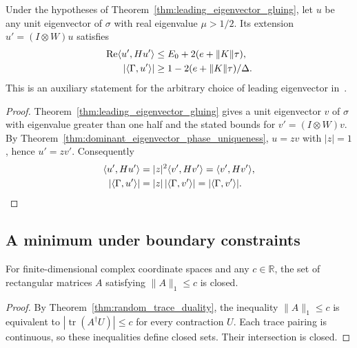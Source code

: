 \begin{theorem}
    \label{thm:leading_eigenvector_uniform_bounds}
    \leanok
    Under the hypotheses of Theorem~\ref{thm:leading_eigenvector_gluing},
    let $u$ be any unit eigenvector of $\sigma$ with real eigenvalue
    $\mu>1/2$. Its extension $u'=(I\otimes W)u$ satisfies
    \begin{align}
        \operatorname{Re}\langle u',Hu'\rangle
         & \le E_0+2(e+\|K\|\tau),\notag     \\
        |\langle\Gamma,u'\rangle|
         & \ge1-2(e+\|K\|\tau)/\Delta.\notag
    \end{align}
    This is an auxiliary statement for the arbitrary choice of leading
    eigenvector in~\cite[Lemma~2.5, source lines 493--505]{Landau2013PolynomialTime}.
\end{theorem}
\begin{proof}\leanok
    Theorem~\ref{thm:leading_eigenvector_gluing} gives a unit eigenvector
    $v$ of $\sigma$ with eigenvalue greater than one half and the stated
    bounds for $v'=(I\otimes W)v$.
    By Theorem~\ref{thm:dominant_eigenvector_phase_uniqueness}, $u=zv$ with
    $|z|=1$, hence $u'=zv'$. Consequently
    \begin{align}
        \langle u',Hu'\rangle     & =|z|^2\langle v',Hv'\rangle
        =\langle v',Hv'\rangle,\notag                               \\
        |\langle\Gamma,u'\rangle| & =|z|\,|\langle\Gamma,v'\rangle|
        =|\langle\Gamma,v'\rangle|.\notag
    \end{align}
\end{proof}

\subsection{A minimum under boundary constraints}

\begin{theorem}
    \label{thm:trace_norm_sublevel_closed}
    \leanok
    For finite-dimensional complex coordinate spaces and any $c\in\mathbb R$,
    the set of rectangular matrices $A$ satisfying $\lVert A\rVert_1\le c$
    is closed.
\end{theorem}
\begin{proof}\leanok
    By Theorem~\ref{thm:random_trace_duality}, the inequality
    $\lVert A\rVert_1\le c$ is equivalent to
    $|\operatorname{tr}(A^\dagger U)|\le c$ for every contraction $U$.
    Each trace pairing is continuous, so these inequalities define closed
    sets. Their intersection is closed.
\end{proof}

